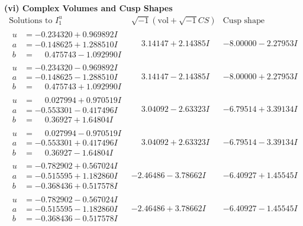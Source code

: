 \documentclass[1p]{elsarticle_modified}
\theoremstyle{definition}
\newcommand{\I}{\sqrt{-1}}
\begin{document}
\newpage\flushleft \textbf{(vi) Complex Volumes and Cusp Shapes}
$$\begin{array}{c|c|c}  
\text{Solutions to }I^u_{1}& \I (\text{vol} + \sqrt{-1}CS) & \text{Cusp shape}\\
 \hline 
\begin{aligned}
u &= -0.234320 + 0.969892 I \\
a &= -0.148625 + 1.288510 I \\
b &= \phantom{-}0.475743 - 1.092990 I\end{aligned}
 & \phantom{-}3.14147 + 2.14385 I & -8.00000 - 2.27953 I \\ \hline\begin{aligned}
u &= -0.234320 - 0.969892 I \\
a &= -0.148625 - 1.288510 I \\
b &= \phantom{-}0.475743 + 1.092990 I\end{aligned}
 & \phantom{-}3.14147 - 2.14385 I & -8.00000 + 2.27953 I \\ \hline\begin{aligned}
u &= \phantom{-}0.027994 + 0.970519 I \\
a &= -0.553301 - 0.417496 I \\
b &= \phantom{-}0.36927 + 1.64804 I\end{aligned}
 & \phantom{-}3.04092 - 2.63323 I & -6.79514 + 3.39134 I \\ \hline\begin{aligned}
u &= \phantom{-}0.027994 - 0.970519 I \\
a &= -0.553301 + 0.417496 I \\
b &= \phantom{-}0.36927 - 1.64804 I\end{aligned}
 & \phantom{-}3.04092 + 2.63323 I & -6.79514 - 3.39134 I \\ \hline\begin{aligned}
u &= -0.782902 + 0.567024 I \\
a &= -0.515595 + 1.182860 I \\
b &= -0.368436 + 0.517578 I\end{aligned}
 & -2.46486 - 3.78662 I & -6.40927 + 1.45545 I \\ \hline\begin{aligned}
u &= -0.782902 - 0.567024 I \\
a &= -0.515595 - 1.182860 I \\
b &= -0.368436 - 0.517578 I\end{aligned}
 & -2.46486 + 3.78662 I & -6.40927 - 1.45545 I \\ \hline\begin{aligned}

\end{aligned}
\end{array}$$
\end{document}
